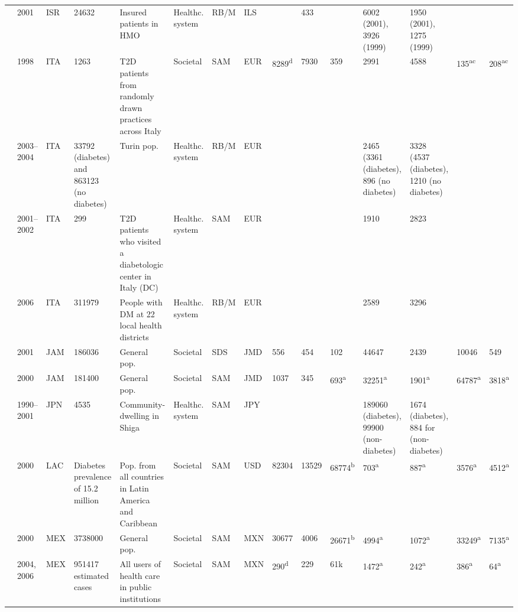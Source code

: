 {\begin{landscape}
\begin{tabularx}{\linewidth}{Z X X Z Z X X X X X X X X Y Y}
\textcite{Chodick2005a} & 2001 & ISR & 24632 & Insured patients in HMO & Healthc. system & RB/M & ILS &  & 433 &  & 6002 (2001), 3926 (1999) & 1950 (2001), 1275 (1999) &  &  \\
\textcite{Lucioni2003} & 1998 & ITA & 1263 & T2D patients from randomly drawn practices   across Italy & Societal & SAM & EUR & 8289\textsuperscript{d} & 7930 & 359 & 2991 & 4588 & 135\textsuperscript{ac} & 208\textsuperscript{ac} \\
\textcite{Bruno2012} & 2003--2004 & ITA & 33792 (diabetes) and 863123 (no diabetes) & Turin pop. & Healthc. system & RB/M & EUR &  &  &  & 2465 (3361 (diabetes), 896 (no diabetes) & 3328 (4537 (diabetes), 1210 (no diabetes) &  &  \\
\textcite{Morsanutto2006b} & 2001--2002 & ITA & 299 & T2D patients who visited a diabetologic   center in Italy (DC) & Healthc. system & SAM & EUR &  &  &  & 1910 & 2823 &  &  \\
\textcite{Marchesini2011b} & 2006 & ITA & 311979 & People with DM at 22 local health districts & Healthc. system & RB/M & EUR &  &  &  & 2589 & 3296 &  &  \\
\textcite{Abdulkadri2009b} & 2001 & JAM & 186036 & General pop. & Societal & SDS & JMD & 556 & 454 & 102 & 44647 & 2439 & 10046 & 549 \\
\textcite{Barcelo2003} & 2000 & JAM & 181400 & General pop. & Societal & SAM & JMD & 1037 & 345 & 693\textsuperscript{a} & 32251\textsuperscript{a} & 1901\textsuperscript{a} & 64787\textsuperscript{a} & 3818\textsuperscript{a} \\
\textcite{Nakamura2008} & 1990--2001 & JPN & 4535 & Community-dwelling in Shiga & Healthc. system & SAM & JPY &  &  &  & 189060 (diabetes), 99900 (non-diabetes) & 1674 (diabetes), 884 for (non-diabetes) &  &  \\
\textcite{Barcelo2003} & 2000 & LAC & Diabetes prevalence of 15.2 million & Pop. from all countries in Latin America   and Caribbean & Societal & SAM & USD & 82304 & 13529 & 68774\textsuperscript{b} & 703\textsuperscript{a} & 887\textsuperscript{a} & 3576\textsuperscript{a} & 4512\textsuperscript{a} \\
\textcite{Barcelo2003} & 2000 & MEX & 3738000 & General pop. & Societal & SAM & MXN & 30677 & 4006 & 26671\textsuperscript{b} & 4994\textsuperscript{a} & 1072\textsuperscript{a} & 33249\textsuperscript{a} & 7135\textsuperscript{a} \\
\textcite{Arredondo2005a} & 2004, 2006 & MEX & 951417 estimated cases & All users of health care in public   institutions & Societal & SAM & MXN & 290\textsuperscript{d} & 229 & 61k & 1472\textsuperscript{a} & 242\textsuperscript{a} & 386\textsuperscript{a} & 64\textsuperscript{a} \\

\end{tabularx}
\end{landscape}}
